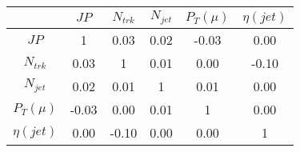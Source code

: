 \begin{tabular}{|c|c|c|c|c|c|} 
\hline
 & $JP$ & $N_{trk}$ & $N_{jet}$ & $P_{T} (\mu)$ & $\eta (jet)$ \\ \hline
$JP$ & 1 & 0.03 & 0.02 & -0.03 & 0.00 \\
$N_{trk}$ & 0.03 & 1 & 0.01 & 0.00 & -0.10 \\
$N_{jet}$ & 0.02 & 0.01 & 1 & 0.01 & 0.00 \\
$P_{T} (\mu)$ & -0.03 & 0.00 & 0.01 & 1 & 0.00 \\
$\eta (jet)$ & 0.00 & -0.10 & 0.00 & 0.00 & 1 \\
\hline 
\end{tabular} 


